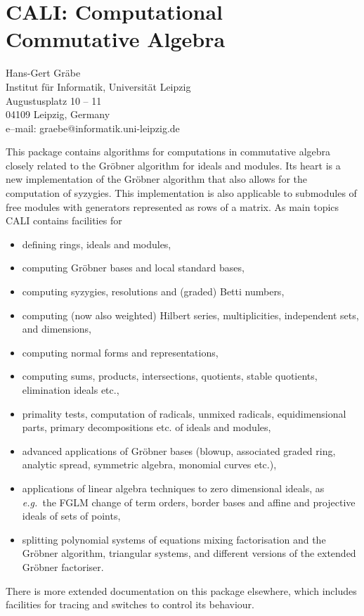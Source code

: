 \chapter[CALI: Commutative Algebra]{CALI: Computational Commutative Algebra}
\label{CALI}

{\footnotesize
\begin{center}
Hans-Gert Gr\"abe \\
Institut f\"ur Informatik, Universit\"at Leipzig\\
Augustusplatz 10 -- 11\\
04109 Leipzig, Germany \\[0.05in]
e--mail: graebe@informatik.uni-leipzig.de
\end{center}
}


This package contains algorithms for computations in commutative algebra
closely related to the Gr\"obner algorithm for ideals and modules.  Its
heart is a new implementation of the Gr\"obner algorithm that also allows
for the computation of syzygies.  This implementation is also applicable to
submodules of free modules with generators represented as rows of a matrix.
As main topics CALI contains facilities for
\begin{itemize}
\item defining rings, ideals and modules,

\item computing Gr\"obner bases and local standard bases,

\item computing syzygies, resolutions and (graded) Betti numbers,

\item computing (now also weighted) Hilbert series, multiplicities,
independent sets, and dimensions,

\item computing normal forms and representations,

\item computing sums, products, intersections, quotients, stable
quotients, elimination ideals etc.,

\item primality tests, computation of radicals, unmixed radicals,
equidimensional parts, primary decompositions etc. of ideals and
modules,

\item advanced applications of Gr\"obner bases (blowup, associated graded
ring, analytic spread, symmetric algebra, monomial curves etc.),

\item applications of linear algebra techniques to zero dimensional
	ideals, as {\em e.g.\ }the FGLM change of term orders, border bases
	and affine and projective ideals of sets of points,

\item splitting polynomial systems of equations mixing factorisation and
the Gr\"obner algorithm, triangular systems, and different versions of the
extended Gr\"obner factoriser.

\end{itemize}

There is more extended documentation on this package elsewhere, which
includes facilities for tracing and switches to control its behaviour.

